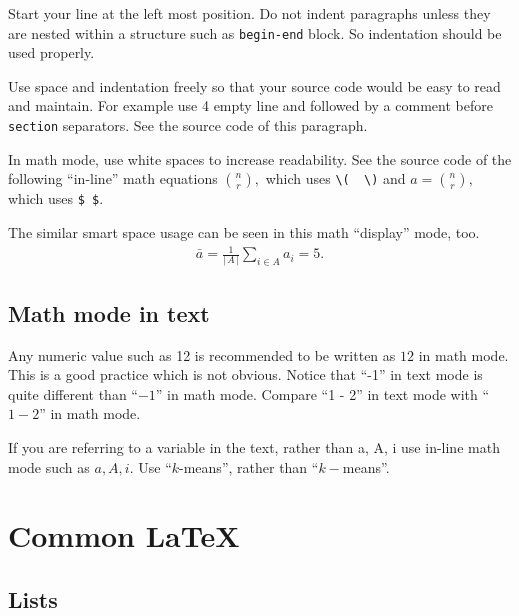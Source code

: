 \documentclass[10pt,journal,compsoc]{IEEEtran}
\newcommand{\hCode}[1]{\texttt{#1}}
\newcommand{\hAbs}[1]{\ensuremath{\left \lvert \, #1 \, \right \rvert} } %
\theoremstyle{plain}
\theoremstyle{definition}
\theoremstyle{remark}
\begin{document}
Start your line at the left most position.
Do not indent paragraphs unless they are nested within a structure such as \hCode{begin-end} block.
So indentation should be used properly.

Use space and indentation freely so that your source code would be easy to read and maintain.
For example use 4 empty line and followed by a comment before \hCode{section} separators.
See the source code of this paragraph.

In math mode, 
use white spaces to increase readability.
See the source code of the following ``in-line'' math equations
\(
	\binom{n}{r},
\)
which uses \verb!\(  \)!
and
$
	a = {n \choose r},
$
which uses \verb!$ $!.

The similar smart space usage can be seen in this math ``display'' mode, too.
\begin{align}
	\bar{a} 
		= 
			\frac
				{1}
				{\hAbs{A}}
			\sum_{i \in A} 
				a_{i}
		= 5.
\end{align}




\subsection{Math mode in text}

Any numeric value such as 12 is recommended to be written as $12$ in math mode.
This is a good practice which is not obvious.
Notice that ``-1'' in text mode is quite different than ``$-1$'' in math mode.
Compare ``1 - 2'' in text mode with ``$1 - 2$'' in math mode.

If you are referring to a variable in the text,
rather than a, A, i
use in-line math mode such as $a, A, i$.
Use ``$k$-means'', rather than ``$k-$means''.




\section{Common \LaTeX}




\subsection{Lists}




\end{document}
